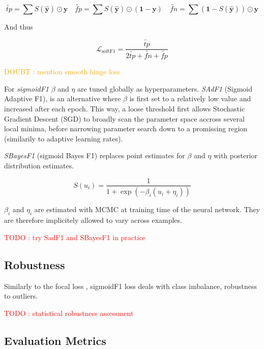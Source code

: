 \documentclass[sigconf,natbib,screen=true,review=true,anonymous]{acmart}
\newcommand\todo[1]{\textcolor{red}{TODO : #1}}
\newcommand\doubt[1]{\textcolor{orange}{DOUBT : #1}}
\begin{document}
$$
\widetilde{tp}=\sum S(\hat{\mathbf{y}}) \odot \mathbf{y} \quad\widetilde{fp}= \sum S(\hat{\mathbf{y}}) \odot (\mathbf{1} - \mathbf{y}) \quad \widetilde{f n}= \sum (\mathbf{1} - S(\hat{\mathbf{y}})) \odot \mathbf{y}
$$

And thus

\begin{equation}
\mathcal{L}_{\text {softF1}}= \frac{\widetilde{tp}}{2 \widetilde{tp}+ \widetilde{fn}+ \widetilde{fp}}
\end{equation}

\doubt{mention smooth hinge loss} \cite{smoothHinge}

For \emph{sigmoidF1} \(\beta\) and \(\eta\) are tuned globally as hyperparameters. \emph{SAdF1} (Sigmoid Adaptive F1), is an alternative where \(\beta\) is first set to a relatively low value and increased after each epoch. This way, a loose threshold first allows Stochastic Gradient Descent (SGD) to broadly scan the parameter space accross several local minima, before narrowing parameter search down to a promissing region (similarily to adaptive learning rates).

\emph{SBayesF1} (sigmoid Bayes F1) replaces point estimates for \(\beta\) and \(\eta\) with posterior distribution estimates. 

\begin{equation}
S(u_i) = \frac{1}{1+\exp (-\beta_i (u_i + \eta_i))}
\end{equation}



\(\beta_i\) and \(\eta_i\) are estimated with MCMC at training time of the neural network. They are therefore implicitely allowed to vary across examples.

\todo{try SadF1 and SBayesF1 in practice}


\subsection{Robustness}
\label{sec:org4e68c45}


Similarly to the focal loss \cite{focalLoss}, sigmoidF1 loss deals with class imbalance, robustness to outliers.

\todo{statistical robustness assessment}



\subsection{Evaluation Metrics}
\label{sec:orge859df1}
\end{document}
